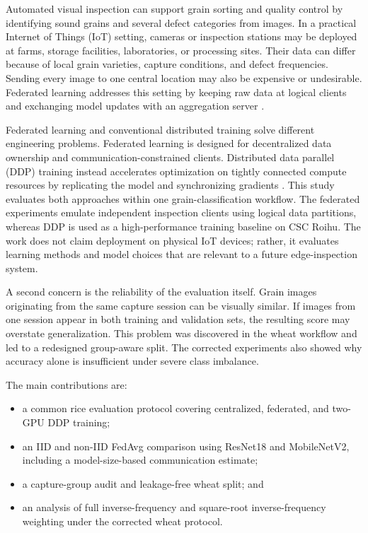 \documentclass[conference]{IEEEtran}
\begin{document}
Automated visual inspection can support grain sorting and quality control by identifying sound grains and several defect categories from images. In a practical Internet of Things (IoT) setting, cameras or inspection stations may be deployed at farms, storage facilities, laboratories, or processing sites. Their data can differ because of local grain varieties, capture conditions, and defect frequencies. Sending every image to one central location may also be expensive or undesirable. Federated learning addresses this setting by keeping raw data at logical clients and exchanging model updates with an aggregation server \cite{mcmahan2017,nguyen2021}.

Federated learning and conventional distributed training solve different engineering problems. Federated learning is designed for decentralized data ownership and communication-constrained clients. Distributed data parallel (DDP) training instead accelerates optimization on tightly connected compute resources by replicating the model and synchronizing gradients \cite{li2020ddp}. This study evaluates both approaches within one grain-classification workflow. The federated experiments emulate independent inspection clients using logical data partitions, whereas DDP is used as a high-performance training baseline on CSC Roihu. The work does not claim deployment on physical IoT devices; rather, it evaluates learning methods and model choices that are relevant to a future edge-inspection system.

A second concern is the reliability of the evaluation itself. Grain images originating from the same capture session can be visually similar. If images from one session appear in both training and validation sets, the resulting score may overstate generalization. This problem was discovered in the wheat workflow and led to a redesigned group-aware split. The corrected experiments also showed why accuracy alone is insufficient under severe class imbalance.

The main contributions are:
\begin{itemize}
    \item a common rice evaluation protocol covering centralized, federated, and two-GPU DDP training;
    \item an IID and non-IID FedAvg comparison using ResNet18 and MobileNetV2, including a model-size-based communication estimate;
    \item a capture-group audit and leakage-free wheat split; and
    \item an analysis of full inverse-frequency and square-root inverse-frequency weighting under the corrected wheat protocol.
\end{itemize}
\end{document}
